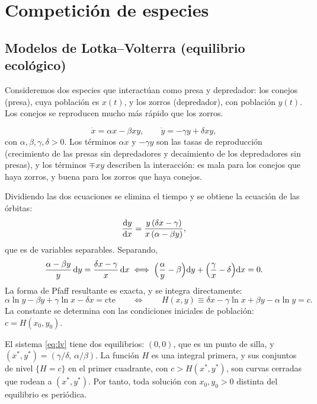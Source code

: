 \section{Competición de especies}\label{sec:competicion}

\subsection{Modelos de Lotka--Volterra (equilibrio ecológico)}

Consideremos dos especies que interactúan como presa y depredador: los conejos (presa), cuya población es $x(t)$, y los zorros (depredador), con población $y(t)$. Los conejos se reproducen mucho más rápido que los zorros.

\begin{modelo}
\begin{equation}
  \dot x = \alpha x - \beta xy, \qquad \dot y = -\gamma y + \delta xy,
  \label{eq:lv}
\end{equation}
con $\alpha,\beta,\gamma,\delta>0$. Los términos $\alpha x$ y $-\gamma y$ son las tasas de reproducción (crecimiento de las presas sin depredadores y decaimiento de los depredadores sin presas), y los términos $\mp xy$ describen la interacción: es mala para los conejos que haya zorros, y buena para los zorros que haya conejos.
\end{modelo}

Dividiendo las dos ecuaciones se elimina el tiempo y se obtiene la ecuación de las órbitas:
\begin{equation}
  \dfrac{\mathrm{d} y}{\mathrm{d} x} = \frac{y\,(\delta x-\gamma)}{x\,(\alpha-\beta y)},
  \label{eq:lv-orbitas}
\end{equation}
que es de variables separables. Separando,
\[
  \frac{\alpha-\beta y}{y}\,\mathrm{d} y = \frac{\delta x-\gamma}{x}\,\mathrm{d} x
  \;\Longleftrightarrow\;
  \Bigl(\frac{\alpha}{y}-\beta\Bigr)\mathrm{d} y + \Bigl(\frac{\gamma}{x}-\delta\Bigr)\mathrm{d} x = 0 .
\]
La forma de Pfaff resultante es exacta, y se integra directamente:
\begin{equation}
  \alpha\ln y-\beta y + \gamma\ln x-\delta x = \text{cte}
  \qquad\Longleftrightarrow\qquad
  H(x,y)\equiv\delta x-\gamma\ln x+\beta y-\alpha\ln y = c .
  \label{eq:lv-integral}
\end{equation}
La constante se determina con las condiciones iniciales de población: $c=H(x_0,y_0)$.

\begin{theorem}\label{thm:lv}
El sistema \eqref{eq:lv} tiene dos equilibrios: $(0,0)$, que es un punto de silla, y $(x^\ast,y^\ast)=(\gamma/\delta,\,\alpha/\beta)$. La función $H$ es una integral primera, y sus conjuntos de nivel $\{H=c\}$ en el primer cuadrante, con $c>H(x^\ast,y^\ast)$, son curvas cerradas que rodean a $(x^\ast,y^\ast)$. Por tanto, toda solución con $x_0,y_0>0$ distinta del equilibrio es periódica.
\end{theorem}

